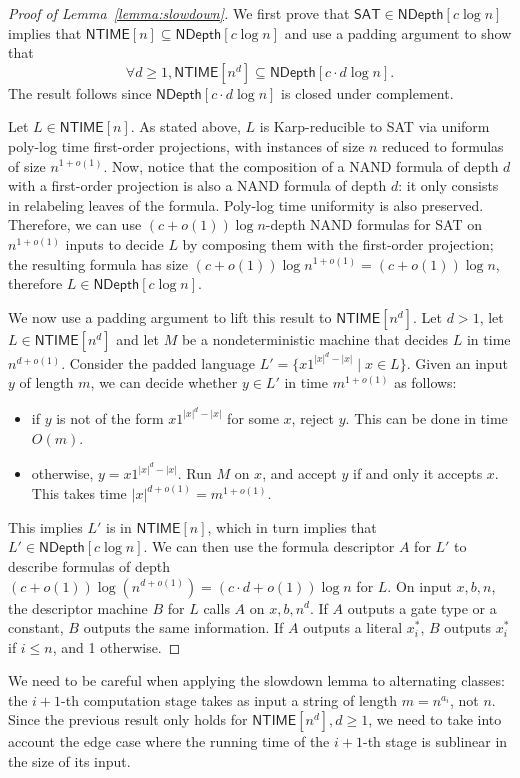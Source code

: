 \documentclass[a4paper, 11pt]{article}
\theoremstyle{plain}
\theoremstyle{definition}
\theoremstyle{remark}
\newcommand{\NTIME}{\textsf{NTIME}}%
\newcommand{\SAT}{\textsf{SAT}}%
\newcommand{\ND}{\textsf{NDepth}}%
\newcommand{\NDL}[1]{\ND\left[ #1 \log n\right]}%
\begin{document}
\begin{proof}[Proof of Lemma~\ref{lemma:slowdown}]
	We first prove that $\SAT{}\in \NDL{c}$ implies that $\NTIME[n] \subseteq \NDL{c}$
	and use a padding argument to show that 
	\[\forall d\ge 1, \NTIME[n^d] \subseteq \NDL{c\cdot d}.\]
	The result follows since $\NDL{c\cdot d}$ is closed under complement.

	Let $L\in\NTIME[n]$. 
	As stated above, $L$ is Karp-reducible to \SAT{} via
	uniform poly-log time first-order projections, 
	with instances of size $n$ reduced to formulas of size $n^{1+o(1)}$.
	Now, notice that the composition of a NAND formula of depth $d$ with a first-order projection
	is also a NAND formula of depth $d$: it only consists in relabeling leaves of the formula.
	Poly-log time uniformity is also preserved. 
	Therefore, we can use $(c+o(1)) \log n$-depth NAND formulas for \SAT{} on $n^{1+o(1)}$
	inputs to decide $L$ by composing them with the first-order projection; 
	the resulting formula has size $(c+o(1)) \log n^{1+o(1)} = (c+o(1)) \log n$,
	therefore $L\in\NDL{c}$.

	We now use a padding argument to lift this result to $\NTIME[n^d]$.
	Let $d>1$, let $L\in \NTIME[n^d]$ and let $M$ be a nondeterministic machine that decides $L$
	in time $n^{d+o(1)}$.
	Consider the padded language $L' = \{x1^{|x|^d - |x|} \mid x\in L\}$.
	Given an input $y$ of length $m$, we can decide whether $y\in L'$ in time 
	$m^{1+o(1)}$ as follows:
	\begin{itemize}
		\item if $y$ is not of the form $x1^{|x|^d - |x|}$ for some $x$, reject $y$.
		This can be done in time $O(m)$.
		\item otherwise, $y = x1^{|x|^d - |x|}$. Run $M$ on $x$, and accept $y$ 
		if and only it accepts $x$. This takes time $|x|^{d+o(1)} = m^{1+o(1)}$.
	\end{itemize}
	This implies $L'$ is in $\NTIME[n]$, which in turn implies that $L'\in\NDL{c}$.
	We can then use the formula descriptor $A$ for $L'$ 
	to describe formulas of depth $(c + o(1))\log \left(n^{d+o(1)}\right) = (c\cdot d + o(1))\log n$ for $L$.
	On input $x,b,n$, the descriptor machine $B$ for $L$  
	calls $A$ on $x, b, n^d$.
	If $A$ outputs a gate type or a constant, $B$ outputs the same information.
	If $A$ outputs a literal $x_i^*$, $B$ outputs $x_i^*$ if $i \le n$, and 1 otherwise.
\end{proof}

We need to be careful when applying the slowdown lemma to alternating classes:
the $i+1$-th computation stage takes as input a string of length $m = n^{a_i}$, not $n$.
Since the previous result only holds for $\NTIME[n^d], d \ge 1$, 
we need to take into account the edge case where the running time of
the $i+1$-th stage is sublinear in the size of its input.
\end{document}
